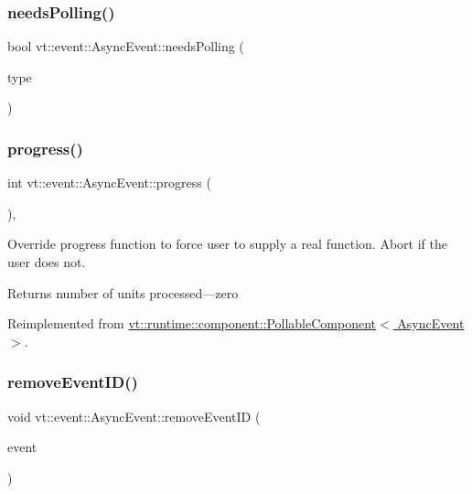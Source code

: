 \subsubsection{\texorpdfstring{needs\+Polling()}{needsPolling()}}
{\footnotesize\ttfamily bool vt\+::event\+::\+Async\+Event\+::needs\+Polling (\begin{DoxyParamCaption}\item[{\hyperlink{namespacevt_1_1event_a1ea9fec44d101bf40b8fd786d44ebed9}{Event\+Record\+Type\+Type} const \&}]{type }\end{DoxyParamCaption})}

\mbox{\label{structvt_1_1event_1_1_async_event_a36f18429bc2856a30c8f7fd70654e0a4}} 
\subsubsection{\texorpdfstring{progress()}{progress()}}
{\footnotesize\ttfamily int vt\+::event\+::\+Async\+Event\+::progress (\begin{DoxyParamCaption}{ }\end{DoxyParamCaption})\hspace{0.3cm}{\ttfamily [override]}, {\ttfamily [virtual]}}



Override progress function to force user to supply a real function. Abort if the user does not. 

\begin{DoxyReturn}{Returns}
number of units processed---zero 
\end{DoxyReturn}


Reimplemented from \hyperlink{structvt_1_1runtime_1_1component_1_1_pollable_component_a34cad810026224d550cd9b0c9d1eff22}{vt\+::runtime\+::component\+::\+Pollable\+Component$<$ Async\+Event $>$}.

\mbox{\label{structvt_1_1event_1_1_async_event_a67a603eff81f5f912118f38fd5cbaccb}} 
\subsubsection{\texorpdfstring{remove\+Event\+I\+D()}{removeEventID()}}
{\footnotesize\ttfamily void vt\+::event\+::\+Async\+Event\+::remove\+Event\+ID (\begin{DoxyParamCaption}\item[{\hyperlink{namespacevt_a009267401def7ae8bf201892222d060f}{Event\+Type} const \&}]{event }\end{DoxyParamCaption})}

